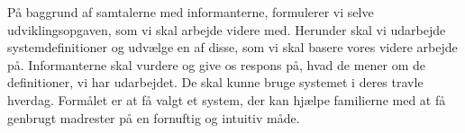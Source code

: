 På baggrund af samtalerne med informanterne, formulerer vi selve udviklingsopgaven, som vi skal arbejde videre med. Herunder skal vi udarbejde systemdefinitioner og udvælge en af disse, som vi skal basere vores videre arbejde på. Informanterne skal vurdere og give os respons på, hvad de mener om de definitioner, vi har udarbejdet. De skal kunne bruge systemet i deres travle hverdag. Formålet er at få valgt et system, der kan hjælpe familierne med at få genbrugt madrester på en fornuftig og intuitiv måde.